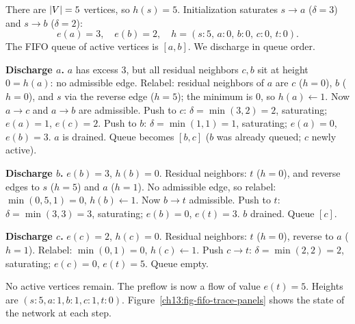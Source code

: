 \begin{center}
\end{center}

There are $\lvert V\rvert=5$ vertices, so $h(s)=5$. Initialization saturates $s\!\to\!a$ ($\delta=3$) and $s\!\to\!b$ ($\delta=2$):
\[
  e(a)=3,\quad e(b)=2,\quad h=(s{:}5,\,a{:}0,\,b{:}0,\,c{:}0,\,t{:}0).
\]
The FIFO queue of active vertices is $[a,b]$. We discharge in queue order.

\textbf{Discharge $a$.} $a$ has excess $3$, but all residual neighbors $c,b$ sit at height $0=h(a)$: no admissible edge. Relabel: residual neighbors of $a$ are $c$ ($h=0$), $b$ ($h=0$), and $s$ via the reverse edge ($h=5$); the minimum is $0$, so $h(a)\gets1$. Now $a\!\to\!c$ and $a\!\to\!b$ are admissible. Push to $c$: $\delta=\min(3,2)=2$, saturating; $e(a)=1$, $e(c)=2$. Push to $b$: $\delta=\min(1,1)=1$, saturating; $e(a)=0$, $e(b)=3$. $a$ is drained. Queue becomes $[b,c]$ ($b$ was already queued; $c$ newly active).

\textbf{Discharge $b$.} $e(b)=3$, $h(b)=0$. Residual neighbors: $t$ ($h=0$), and reverse edges to $s$ ($h=5$) and $a$ ($h=1$). No admissible edge, so relabel: $\min(0,5,1)=0$, $h(b)\gets1$. Now $b\!\to\!t$ admissible. Push to $t$: $\delta=\min(3,3)=3$, saturating; $e(b)=0$, $e(t)=3$. $b$ drained. Queue $[c]$.

\textbf{Discharge $c$.} $e(c)=2$, $h(c)=0$. Residual neighbors: $t$ ($h=0$), reverse to $a$ ($h=1$). Relabel: $\min(0,1)=0$, $h(c)\gets1$. Push $c\!\to\!t$: $\delta=\min(2,2)=2$, saturating; $e(c)=0$, $e(t)=5$. Queue empty.

No active vertices remain. The preflow is now a flow of value $e(t)=5$. Heights are $(s{:}5,a{:}1,b{:}1,c{:}1,t{:}0)$. Figure~\ref{ch13:fig-fifo-trace-panels} shows the state of the network at each step.


